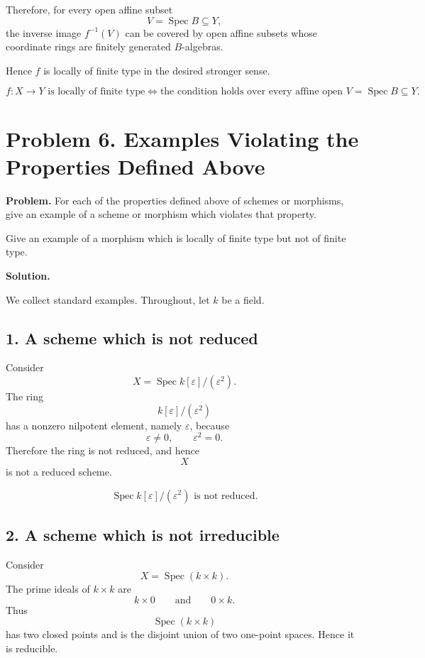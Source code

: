 \documentclass[12pt,a4paper]{article}
\theoremstyle{notespace}
\begin{document}
Therefore, for every open affine subset
\[
V=\operatorname{Spec}B\subseteq Y,
\]
the inverse image \(f^{-1}(V)\) can be covered by open affine subsets whose coordinate rings are finitely generated \(B\)-algebras.

Hence \(f\) is locally of finite type in the desired stronger sense.

\[
\boxed{
	f:X\to Y \text{ is locally of finite type}
	\iff
	\text{the condition holds over every affine open } V=\operatorname{Spec}B\subseteq Y.
}
\]


\section{Problem 6. Examples Violating the Properties Defined Above}

\textbf{Problem.}
For each of the properties defined above of schemes or morphisms, give an example of a scheme or morphism which violates that property.

Give an example of a morphism which is locally of finite type but not of finite type.

\textbf{Solution.}

We collect standard examples. Throughout, let \(k\) be a field.

\subsection*{1. A scheme which is not reduced}

Consider
\[
X=\operatorname{Spec} k[\varepsilon]/(\varepsilon^2).
\]
The ring
\[
k[\varepsilon]/(\varepsilon^2)
\]
has a nonzero nilpotent element, namely \(\varepsilon\), because
\[
\varepsilon\neq 0,
\qquad
\varepsilon^2=0.
\]
Therefore the ring is not reduced, and hence
\[
X
\]
is not a reduced scheme.

\[
\boxed{
	\operatorname{Spec} k[\varepsilon]/(\varepsilon^2)
	\text{ is not reduced.}
}
\]

\subsection*{2. A scheme which is not irreducible}

Consider
\[
X=\operatorname{Spec}(k\times k).
\]
The prime ideals of \(k\times k\) are
\[
k\times 0
\qquad\text{and}\qquad
0\times k.
\]
Thus
\[
\operatorname{Spec}(k\times k)
\]
has two closed points and is the disjoint union of two one-point spaces. Hence it is reducible.
\end{document}
